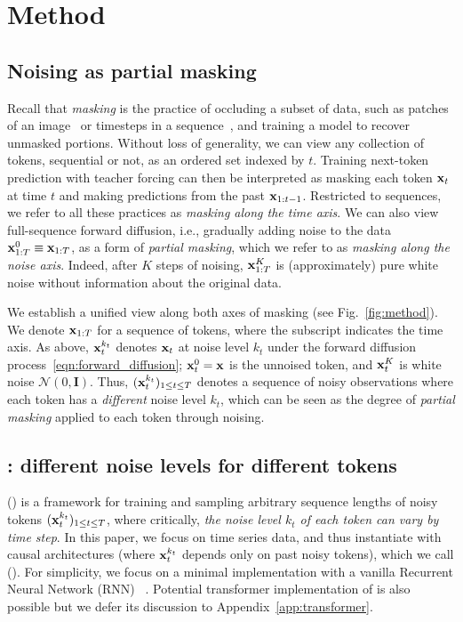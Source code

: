 \section{Method}

\subsection{Noising as partial masking}
Recall that \emph{masking} is the practice of occluding a subset of data, such as patches of an image~\cite{he2022masked} or timesteps in a sequence~\cite{bert, t5}, and training a model to recover unmasked portions. 
Without loss of generality, we can view any collection of tokens, sequential or not, as an ordered set indexed by $t$.
Training next-token prediction with teacher forcing can then be interpreted as masking each token $\mathbf{x}_t$ at time $t$ and making predictions from the past  $\mathbf{x}_{1:t-1}$. Restricted to sequences, we refer to all these practices as \emph{masking along the time axis}. We can also view full-sequence forward diffusion, i.e., gradually adding noise to the data $ \mathbf{x}^0_{1:T} \equiv \mathbf{x}_{1:T}$, as a form of \emph{partial masking}, which we refer to as \emph{masking along the noise axis}. Indeed, after $K$ steps of noising, $\mathbf{x}^K_{1:T}$ is (approximately) pure white noise without information about the original data.

We establish a unified view along both axes of masking (see Fig.~\ref{fig:method}).  We denote  $\mathbf{x}_{1:T}$ for a sequence of tokens, where the subscript indicates the time axis. As above, $\mathbf{x}_t^{k_t}$ denotes $\mathbf{x}_t$ at noise level $k_t$ under the forward diffusion process~\eqref{eqn:forward_diffusion};  $\mathbf{x}_t^0 = \mathbf{x}$ is the unnoised token, and  $\mathbf{x}^K_t$ is white noise $ \mathcal{N}(0, \mathbf{I})$. Thus, $(\mathbf{x}_t^{k_t})_{1 \le t \le T}$ denotes a sequence of noisy observations where each token has a \emph{different} noise level $k_t$, which can be seen as the degree of \emph{partial masking} applied to each token through noising.

\subsection{\algons{}: different noise levels for different tokens}
\emph{\algo{}} ({\algshort}) is a framework for training and sampling arbitrary sequence lengths of noisy tokens $(\mathbf{x}_t^{k_t})_{1 \le t \le T}$, where critically, \emph{the noise level $k_t$ of each token can vary by time step}. 
In this paper, we focus on time series data, and thus instantiate \algo{} with causal architectures (where $\mathbf{x}_t^{k_t}$ depends only on past noisy tokens), which we call \emph{\algoseq{}} ({\algshortseq{}}).
For simplicity, we focus on a minimal implementation with a vanilla Recurrent Neural Network (RNN) ~\cite{gru}. Potential transformer implementation of \algo{} is also possible but we defer its discussion to Appendix~\ref{app:transformer}.

